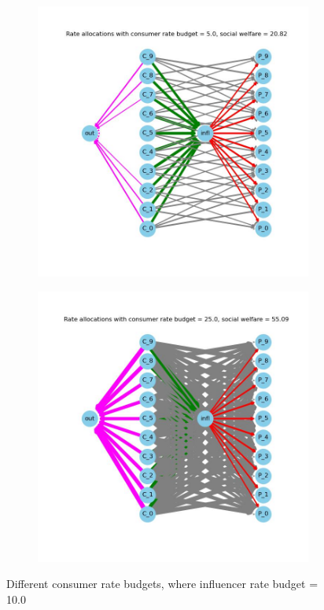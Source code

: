 \documentclass[11pt, letterpaper]{article}
\begin{document}
\begin{figure}[h]
\begin{adjustbox}{max width=1.5\textwidth,center}
\begin{subfigure}[b]{0.4\textwidth}
        \includegraphics[width=\linewidth]{"figures/M/5.0_allocs.jpg"}
    \end{subfigure}
    \begin{subfigure}[b]{0.4\textwidth}
        \includegraphics[width=\linewidth]{"figures/M/25.0_allocs.jpg"}
    \end{subfigure}
\end{adjustbox}
\caption{Different consumer rate budgets, where influencer rate budget = 10.0}
\label{fig:M}
\end{figure}
\end{document}

